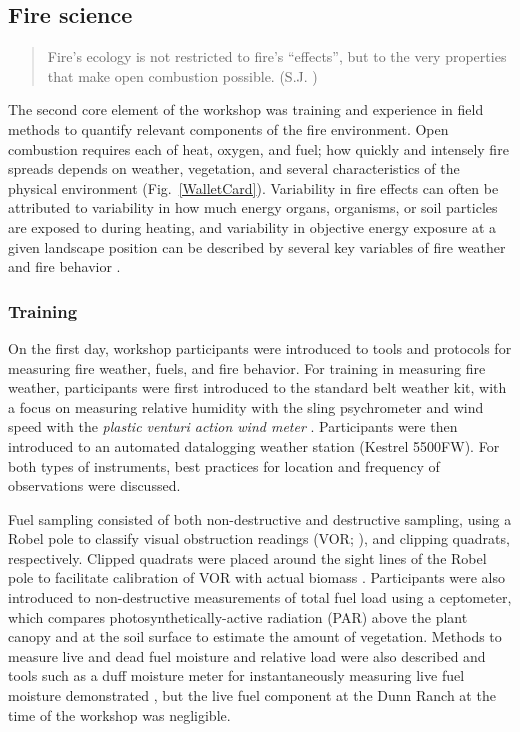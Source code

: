 \documentclass[fire,article,submit,moreauthors,pdftex]{Definitions/mdpi}
\begin{document}
\subsection{Fire science}

\begin{quote}
Fire's ecology is not restricted to fire's ``effects'', but to the very properties that make open combustion possible. (S.J. \citet[][p.~126]{pyne2004})
\end{quote}

The second core element of the workshop was training and experience in field methods to quantify relevant components of the fire environment.
Open combustion requires each of heat, oxygen, and fuel; how quickly and intensely fire spreads depends on weather, vegetation, and several characteristics of the physical environment (Fig.~\ref{WalletCard}).
Variability in fire effects can often be attributed to variability in how much energy organs, organisms, or soil particles are exposed to during heating, and variability in objective energy exposure at a given landscape position can be described by several key variables of fire weather and fire behavior \citep{mcgranahan2021}.

\subsubsection{Training}

On the first day, workshop participants were introduced to tools and protocols for measuring fire weather, fuels, and fire behavior.
For training in measuring fire weather, participants were first introduced to the standard belt weather kit, with a focus on measuring relative humidity with the sling psychrometer and wind speed with the \emph{plastic venturi action wind meter} \citep{BeltWxKit}.
Participants were then introduced to an automated datalogging weather station (Kestrel 5500FW).
For both types of instruments, best practices for location and frequency of observations were discussed.

Fuel sampling consisted of both non-destructive and destructive sampling, using a Robel pole to classify visual obstruction readings (VOR; \citep{robel1970}), and clipping quadrats, respectively.
Clipped quadrats were placed around the sight lines of the Robel pole to facilitate calibration of VOR with actual biomass \citep{vermeire2002}.
Participants were also introduced to non-destructive measurements of total fuel load using a ceptometer, which compares photosynthetically-active radiation (PAR) above the plant canopy and at the soil surface to estimate the amount of vegetation.
Methods to measure live and dead fuel moisture and relative load were also described and tools such as a duff moisture meter for instantaneously measuring live fuel moisture demonstrated \citep{mcgranahan2019}, but the live fuel component at the Dunn Ranch at the time of the workshop was negligible.
\end{document}
